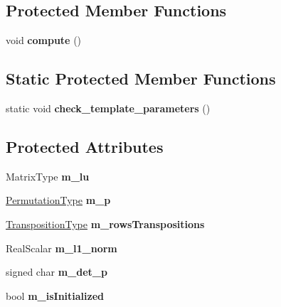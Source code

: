 \subsection*{Protected Member Functions}
\begin{DoxyCompactItemize}
\item 
\mbox{\label{class_eigen_1_1_partial_piv_l_u_a8dc40bd1ef7ac09d58587b1b97fca91d}} 
void {\bfseries compute} ()
\end{DoxyCompactItemize}
\subsection*{Static Protected Member Functions}
\begin{DoxyCompactItemize}
\item 
\mbox{\label{class_eigen_1_1_partial_piv_l_u_a561b9022ead4336fdacb687f6be86a53}} 
static void {\bfseries check\+\_\+template\+\_\+parameters} ()
\end{DoxyCompactItemize}
\subsection*{Protected Attributes}
\begin{DoxyCompactItemize}
\item 
\mbox{\label{class_eigen_1_1_partial_piv_l_u_a447c0c44420cb6677fbb92d55fbab417}} 
Matrix\+Type {\bfseries m\+\_\+lu}
\item 
\mbox{\label{class_eigen_1_1_partial_piv_l_u_aedc36fc61bd34887a3c2fe5800167f2d}} 
\mbox{\hyperlink{class_eigen_1_1_permutation_matrix}{Permutation\+Type}} {\bfseries m\+\_\+p}
\item 
\mbox{\label{class_eigen_1_1_partial_piv_l_u_aa71083e9e1ef21838a3058ec0ffd0510}} 
\mbox{\hyperlink{class_eigen_1_1_transpositions}{Transposition\+Type}} {\bfseries m\+\_\+rows\+Transpositions}
\item 
\mbox{\label{class_eigen_1_1_partial_piv_l_u_a262635d8536e2e790460e3300f4a9e3c}} 
Real\+Scalar {\bfseries m\+\_\+l1\+\_\+norm}
\item 
\mbox{\label{class_eigen_1_1_partial_piv_l_u_a5771dfc25659778e8ccc609440062f5c}} 
signed char {\bfseries m\+\_\+det\+\_\+p}
\item 
\mbox{\label{class_eigen_1_1_partial_piv_l_u_a99833b9547e2b03a5b78244241dc9188}} 
bool {\bfseries m\+\_\+is\+Initialized}
\end{DoxyCompactItemize}


